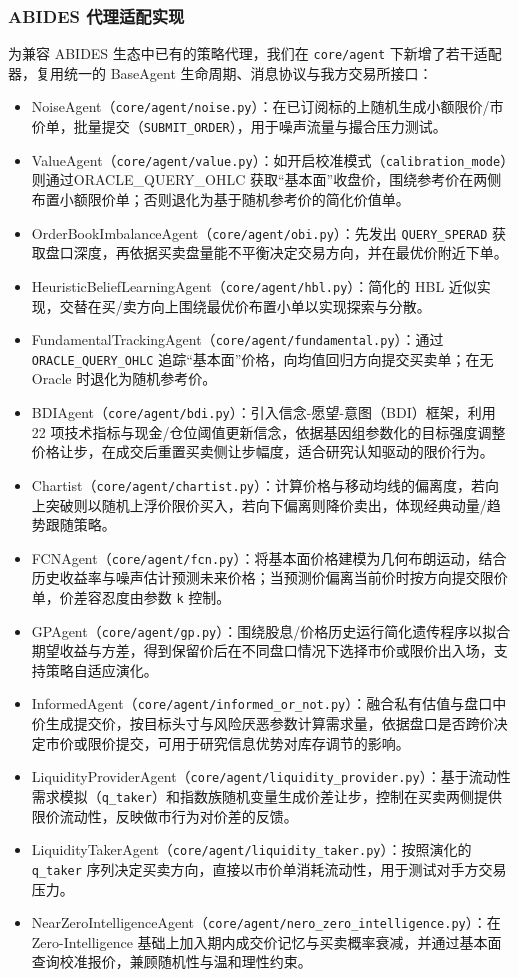 \subsubsection{ABIDES 代理适配实现}
为兼容 ABIDES 生态中已有的策略代理，我们在 \verb|core/agent| 下新增了若干适配器，复用统一的 BaseAgent 生命周期、消息协议与我方交易所接口：
\begin{itemize}
  \item NoiseAgent（\verb|core/agent/noise.py|）：在已订阅标的上随机生成小额限价/市价单，批量提交（\verb|SUBMIT_ORDER|），用于噪声流量与撮合压力测试。
  \item ValueAgent（\verb|core/agent/value.py|）：如开启校准模式（\verb|calibration_mode|）则通过ORACLE\_QUERY\_OHLC 获取“基本面”收盘价，围绕参考价在两侧布置小额限价单；否则退化为基于随机参考价的简化价值单。
  \item OrderBookImbalanceAgent（\verb|core/agent/obi.py|）：先发出 \verb|QUERY_SPERAD| 获取盘口深度，再依据买卖盘量能不平衡决定交易方向，并在最优价附近下单。
  \item HeuristicBeliefLearningAgent（\verb|core/agent/hbl.py|）：简化的 HBL 近似实现，交替在买/卖方向上围绕最优价布置小单以实现探索与分散。
  \item FundamentalTrackingAgent（\verb|core/agent/fundamental.py|）：通过 \verb|ORACLE_QUERY_OHLC| 追踪“基本面”价格，向均值回归方向提交买卖单；在无 Oracle 时退化为随机参考价。
  \item BDIAgent（\verb|core/agent/bdi.py|）：引入信念-愿望-意图（BDI）框架，利用 22 项技术指标与现金/仓位阈值更新信念，依据基因组参数化的目标强度调整价格让步，在成交后重置买卖侧让步幅度，适合研究认知驱动的限价行为。
  \item Chartist（\verb|core/agent/chartist.py|）：计算价格与移动均线的偏离度，若向上突破则以随机上浮价限价买入，若向下偏离则降价卖出，体现经典动量/趋势跟随策略。
  \item FCNAgent（\verb|core/agent/fcn.py|）：将基本面价格建模为几何布朗运动，结合历史收益率与噪声估计预测未来价格；当预测价偏离当前价时按方向提交限价单，价差容忍度由参数 \verb|k| 控制。
  \item GPAgent（\verb|core/agent/gp.py|）：围绕股息/价格历史运行简化遗传程序以拟合期望收益与方差，得到保留价后在不同盘口情况下选择市价或限价出入场，支持策略自适应演化。
  \item InformedAgent（\verb|core/agent/informed_or_not.py|）：融合私有估值与盘口中价生成提交价，按目标头寸与风险厌恶参数计算需求量，依据盘口是否跨价决定市价或限价提交，可用于研究信息优势对库存调节的影响。
  \item LiquidityProviderAgent（\verb|core/agent/liquidity_provider.py|）：基于流动性需求模拟（\verb|q_taker|）和指数族随机变量生成价差让步，控制在买卖两侧提供限价流动性，反映做市行为对价差的反馈。
  \item LiquidityTakerAgent（\verb|core/agent/liquidity_taker.py|）：按照演化的 \verb|q_taker| 序列决定买卖方向，直接以市价单消耗流动性，用于测试对手方交易压力。
  \item NearZeroIntelligenceAgent（\verb|core/agent/nero_zero_intelligence.py|）：在 Zero-Intelligence 基础上加入期内成交价记忆与买卖概率衰减，并通过基本面查询校准报价，兼顾随机性与温和理性约束。
\end{itemize}

